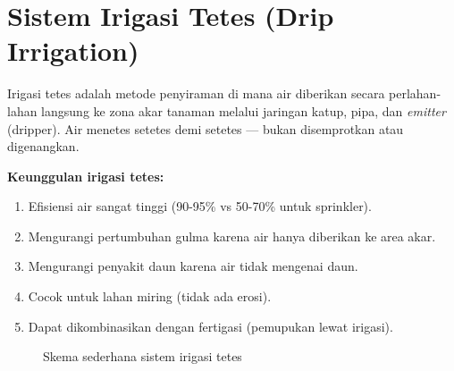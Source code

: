 \documentclass[12pt,a4paper,oneside]{report}
\begin{document}
\section{Sistem Irigasi Tetes (Drip Irrigation)}

Irigasi tetes adalah metode penyiraman di mana air diberikan secara perlahan-lahan langsung ke zona akar tanaman melalui jaringan katup, pipa, dan \textit{emitter} (dripper). Air menetes setetes demi setetes — bukan disemprotkan atau digenangkan.

\textbf{Keunggulan irigasi tetes:}
\begin{enumerate}
    \item Efisiensi air sangat tinggi (90-95\% vs 50-70\% untuk sprinkler).
    \item Mengurangi pertumbuhan gulma karena air hanya diberikan ke area akar.
    \item Mengurangi penyakit daun karena air tidak mengenai daun.
    \item Cocok untuk lahan miring (tidak ada erosi).
    \item Dapat dikombinasikan dengan fertigasi (pemupukan lewat irigasi).
\end{enumerate}

\begin{figure}[H]
\centering
{}
\caption{Skema sederhana sistem irigasi tetes}
\label{fig:drip}
\end{figure}
\end{document}
